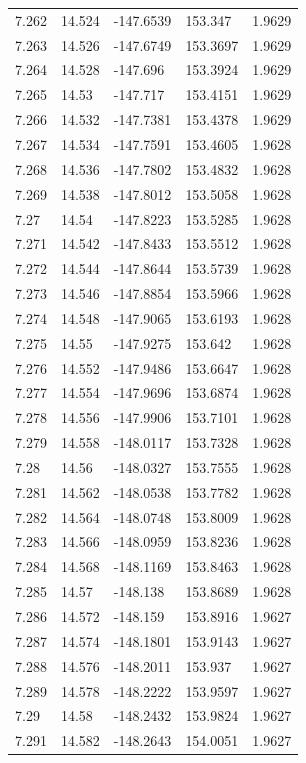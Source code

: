 \begin{tabular}{lllll}
7.262 & 14.524 & -147.6539 & 153.347 & 1.9629 \\
7.263 & 14.526 & -147.6749 & 153.3697 & 1.9629 \\
7.264 & 14.528 & -147.696 & 153.3924 & 1.9629 \\
7.265 & 14.53 & -147.717 & 153.4151 & 1.9629 \\
7.266 & 14.532 & -147.7381 & 153.4378 & 1.9629 \\
7.267 & 14.534 & -147.7591 & 153.4605 & 1.9628 \\
7.268 & 14.536 & -147.7802 & 153.4832 & 1.9628 \\
7.269 & 14.538 & -147.8012 & 153.5058 & 1.9628 \\
7.27 & 14.54 & -147.8223 & 153.5285 & 1.9628 \\
7.271 & 14.542 & -147.8433 & 153.5512 & 1.9628 \\
7.272 & 14.544 & -147.8644 & 153.5739 & 1.9628 \\
7.273 & 14.546 & -147.8854 & 153.5966 & 1.9628 \\
7.274 & 14.548 & -147.9065 & 153.6193 & 1.9628 \\
7.275 & 14.55 & -147.9275 & 153.642 & 1.9628 \\
7.276 & 14.552 & -147.9486 & 153.6647 & 1.9628 \\
7.277 & 14.554 & -147.9696 & 153.6874 & 1.9628 \\
7.278 & 14.556 & -147.9906 & 153.7101 & 1.9628 \\
7.279 & 14.558 & -148.0117 & 153.7328 & 1.9628 \\
7.28 & 14.56 & -148.0327 & 153.7555 & 1.9628 \\
7.281 & 14.562 & -148.0538 & 153.7782 & 1.9628 \\
7.282 & 14.564 & -148.0748 & 153.8009 & 1.9628 \\
7.283 & 14.566 & -148.0959 & 153.8236 & 1.9628 \\
7.284 & 14.568 & -148.1169 & 153.8463 & 1.9628 \\
7.285 & 14.57 & -148.138 & 153.8689 & 1.9628 \\
7.286 & 14.572 & -148.159 & 153.8916 & 1.9627 \\
7.287 & 14.574 & -148.1801 & 153.9143 & 1.9627 \\
7.288 & 14.576 & -148.2011 & 153.937 & 1.9627 \\
7.289 & 14.578 & -148.2222 & 153.9597 & 1.9627 \\
7.29 & 14.58 & -148.2432 & 153.9824 & 1.9627 \\
7.291 & 14.582 & -148.2643 & 154.0051 & 1.9627 \\

\end{tabular}
